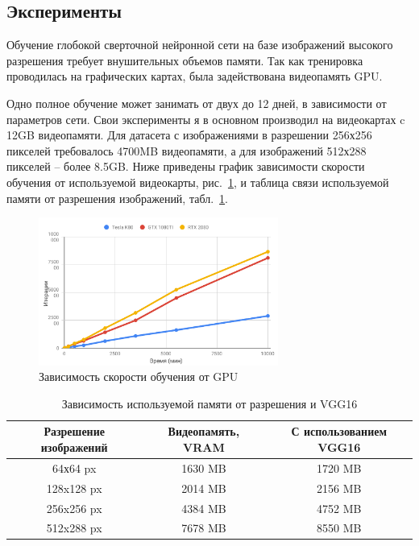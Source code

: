 \documentclass[11pt,a4paper]{extarticle}
\begin{document}
{			
	\subsection{Эксперименты}\label{sec:tests}

		Обучение глобокой сверточной нейронной сети на базе изображений высокого разрешения требует внушительных объемов памяти.
		Так как тренировка проводилась на графических картах, была задействована видеопамять GPU.
		
		Одно полное обучение может занимать от двух до 12 дней, в зависимости от параметров сети.
		Свои эксперименты я в основном производил на видеокартах c 12GB видеопамяти.
		Для датасета с изображениями в разрешении 256х256 пикселей требовалось 4700MB видеопамяти, а для изображений 512х288 пикселей -- более 8.5GB.
		Ниже приведены график зависимости скорости обучения от используемой видеокарты, рис.~\ref{pic:gpu_power}, и таблица связи используемой памяти от разрешения изображений, табл.~\ref{tab:memory}.

		\begin{figure}[ht]
			\centering
			\includegraphics[width=0.7\textwidth]{img/gpu_power}
			\caption{Зависимость скорости обучения от GPU}
			\label{pic:gpu_power}
		\end{figure}

		\begin{table}[ht]
			\centering
			\begin{tabular}{|c|c|c|}
				\hline
				\rowcolor[HTML]{EFEFEF}
				\textbf{Разрешение изображений} & \textbf{Видеопамять, VRAM} & \textbf{С использованием VGG16} \\ \hline
				64х64 px                        & 1630 MB                         & 1720 MB                       \\ \hline
				128x128 px                      & 2014 MB                         & 2156 MB                       \\ \hline
				256x256 px                      & 4384 MB                         & 4752 MB                       \\ \hline
				512x288 px                      & 7678 MB                         & 8550 MB                       \\ \hline
			\end{tabular}
			\caption{Зависимость используемой памяти от разрешения и VGG16}
			\label{tab:memory}
		\end{table}			
		
}
\end{document}
